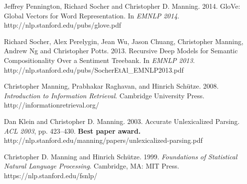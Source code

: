 \documentclass[11pt,letterpaper]{article}
\def\url#1{{\small\sf #1}}
\begin{document}
\begin{vita}
\begin{Products (most closely related)}


\end{Products (most closely related)}


\begin{Products (other significant)}


\item Jeffrey Pennington, Richard Socher and Christopher D. Manning. 2014.
GloVe: Global Vectors for Word Representation. In \emph{EMNLP 2014}. \url{http://nlp.stanford.edu/pubs/glove.pdf}

\item Richard Socher, Alex Perelygin, Jean Wu,  Jason Chuang,
  Christopher Manning, Andrew Ng and Christopher Potts. 2013.
Recursive Deep Models for Semantic Compositionality Over a Sentiment
Treebank. In \emph{EMNLP 2013}. \url{http://nlp.stanford.edu/pubs/SocherEtAl\_EMNLP2013.pdf}

\item Christopher Manning, Prabhakar Raghavan, and Hinrich Sch\"utze. 2008. \emph{Introduction to Information Retrieval}.  Cambridge University Press.
\url{http://informationretrieval.org/}

\item Dan Klein and Christopher D. Manning. 2003. Accurate Unlexicalized Parsing. \emph{ACL 2003}, pp. 423--430. \textbf{Best paper award.} \url{http://nlp.stanford.edu/\texttildelow manning/papers/unlexicalized-parsing.pdf}

\item Christopher D. Manning and Hinrich Sch\"utze. 1999. {\em Foundations
of Statistical Natural Language Processing}.  Cambridge, MA: MIT Press. \url{https://nlp.stanford.edu/fsnlp/}


\end{Products (other significant)}
\end{vita}
\end{document}
